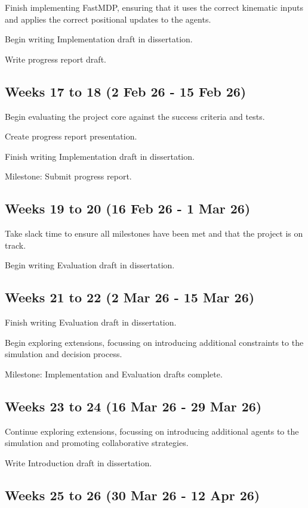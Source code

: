 \begin{refsection}
  Finish implementing FastMDP, ensuring that it uses the correct kinematic inputs and applies the correct positional updates to the agents.

  Begin writing Implementation draft in dissertation.

  Write progress report draft.

  \subsection*{Weeks 17 to 18 (2 Feb 26 - 15 Feb 26)}

  Begin evaluating the project core against the success criteria and tests.

  Create progress report presentation.

  Finish writing Implementation draft in dissertation.

  Milestone: Submit progress report.

  \subsection*{Weeks 19 to 20 (16 Feb 26 - 1 Mar 26)}

  Take slack time to ensure all milestones have been met and that the project is on track.

  Begin writing Evaluation draft in dissertation.

  \subsection*{Weeks 21 to 22 (2 Mar 26 - 15 Mar 26)}

  Finish writing Evaluation draft in dissertation.

  Begin exploring extensions, focussing on introducing additional constraints to the simulation and decision process.

  Milestone: Implementation and Evaluation drafts complete.

  \subsection*{Weeks 23 to 24 (16 Mar 26 - 29 Mar 26)}

  Continue exploring extensions, focussing on introducing additional agents to the simulation and promoting collaborative strategies.

  Write Introduction draft in dissertation.

  \subsection*{Weeks 25 to 26 (30 Mar 26 - 12 Apr 26)}


\end{refsection}
